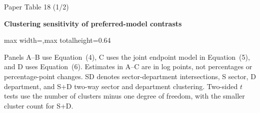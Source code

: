 \begin{frame}{Paper Table 18 (1/2)}
\begin{minipage}{\textwidth}\small\textbf{Clustering sensitivity of preferred-model contrasts}\end{minipage}\par\vspace{0.15cm}
\centering\begingroup\fontsize{8.5}{10}\selectfont
\setlength{\tabcolsep}{4pt}\renewcommand{\arraystretch}{1.06}
\begin{adjustbox}{max width=\textwidth,max totalheight=0.64\textheight}

\end{adjustbox}\endgroup\par\vspace{0.10cm}
{\fontsize{6.5}{7.5}\selectfont\raggedright Panels A--B use Equation~(4), C uses the joint endpoint model in Equation~(5), and D uses Equation~(6). Estimates in A--C are in log points, not percentages or percentage-point changes. SD denotes sector-department intersections, S sector, D department, and S+D two-way sector and department clustering. Two-sided $t$ tests use the number of clusters minus one degree of freedom, with the smaller cluster count for S+D.\par}
\end{frame}

